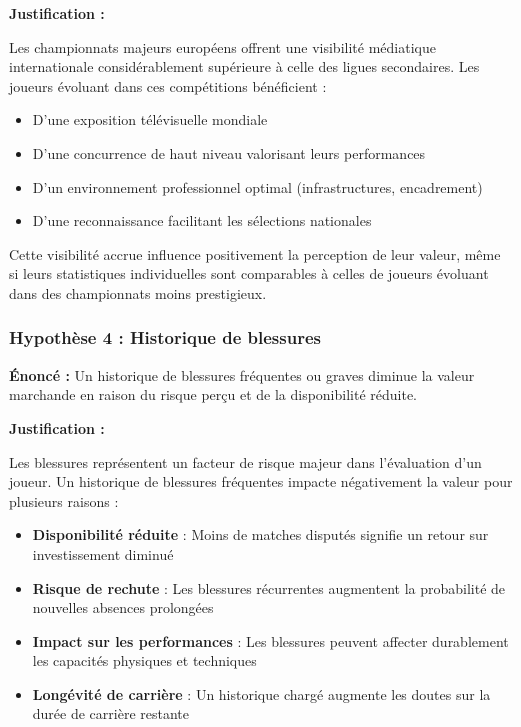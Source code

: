 \documentclass[12pt,a4paper]{article}
\begin{document}
\textbf{Justification :}

Les championnats majeurs européens offrent une visibilité médiatique internationale considérablement supérieure à celle des ligues secondaires. Les joueurs évoluant dans ces compétitions bénéficient :

\begin{itemize}
    \item D'une exposition télévisuelle mondiale
    \item D'une concurrence de haut niveau valorisant leurs performances
    \item D'un environnement professionnel optimal (infrastructures, encadrement)
    \item D'une reconnaissance facilitant les sélections nationales
\end{itemize}

Cette visibilité accrue influence positivement la perception de leur valeur, même si leurs statistiques individuelles sont comparables à celles de joueurs évoluant dans des championnats moins prestigieux.

\subsubsection{Hypothèse 4 : Historique de blessures}

\begin{tcolorbox}[colback=lightgray,colframe=maincolor,width=\textwidth,arc=2mm,boxrule=0.8pt]
    \textbf{Énoncé :} Un historique de blessures fréquentes ou graves diminue la valeur marchande en raison du risque perçu et de la disponibilité réduite.
\end{tcolorbox}

\textbf{Justification :}

Les blessures représentent un facteur de risque majeur dans l'évaluation d'un joueur. Un historique de blessures fréquentes impacte négativement la valeur pour plusieurs raisons :

\begin{itemize}
    \item \textbf{Disponibilité réduite} : Moins de matches disputés signifie un retour sur investissement diminué
    \item \textbf{Risque de rechute} : Les blessures récurrentes augmentent la probabilité de nouvelles absences prolongées
    \item \textbf{Impact sur les performances} : Les blessures peuvent affecter durablement les capacités physiques et techniques
    \item \textbf{Longévité de carrière} : Un historique chargé augmente les doutes sur la durée de carrière restante
\end{itemize}
\end{document}
